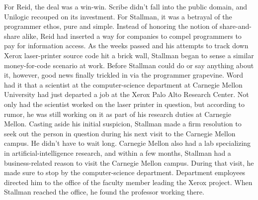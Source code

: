 \ifdefined\eng
For Reid, the deal was a win-win. Scribe didn't fall into the public domain, and Unilogic recouped on its investment. For Stallman, it was a betrayal of the programmer ethos, pure and simple. Instead of honoring the notion of share-and-share alike, Reid had inserted a way for companies to compel programmers to pay for information access.
As the weeks passed and his attempts to track down Xerox laser-printer source code hit a brick wall, Stallman began to sense a similar money-for-code scenario at work. Before Stallman could do or say anything about it, however, good news finally trickled in via the programmer grapevine. Word had it that a scientist at the computer-science department at Carnegie Mellon University had just departed a job at the Xerox Palo Alto Research Center. Not only had the scientist worked on the laser printer in question, but according to rumor, he was still working on it as part of his research duties at Carnegie Mellon.
Casting aside his initial suspicion, Stallman made a firm resolution to seek out the person in question during his next visit to the Carnegie Mellon campus.
He didn't have to wait long. Carnegie Mellon also had a lab specializing in artificial-intelligence research, and within a few months, Stallman had a business-related reason to visit the Carnegie Mellon campus. During that visit, he made sure to stop by the computer-science department. Department employees directed him to the office of the faculty member leading the Xerox project. When Stallman reached the office, he found the professor working there.
\fi



